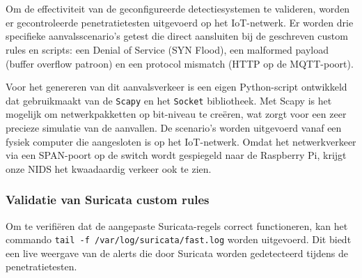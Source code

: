 \chapter{}%
\label{ch:Aanvalsscenario's en actieve validatie}
Om de effectiviteit van de geconfigureerde detectiesystemen te valideren, worden er gecontroleerde penetratietesten uitgevoerd op het IoT-netwerk. Er worden drie specifieke aanvalsscenario's getest die direct aansluiten bij de geschreven custom rules en scripts: een Denial of Service (SYN Flood), een malformed payload (buffer overflow patroon) en een protocol mismatch (HTTP op de MQTT-poort).

Voor het genereren van dit aanvalsverkeer is een eigen Python-script ontwikkeld dat gebruikmaakt van de \texttt{Scapy}  en het \texttt{Socket} bibliotheek. Met Scapy is het mogelijk om netwerkpakketten op bit-niveau te creëren, wat zorgt voor een zeer precieze simulatie van de aanvallen. De scenario’s worden uitgevoerd vanaf een fysiek computer die aangesloten is op het IoT-netwerk. Omdat het netwerkverkeer via een SPAN-poort op de switch wordt gespiegeld naar de Raspberry Pi, krijgt onze NIDS het kwaadaardig verkeer ook te zien.

\subsection{Validatie van Suricata custom rules}
Om te verifiëren dat de aangepaste Suricata-regels correct functioneren, kan het commando \texttt{tail -f /var/log/suricata/fast.log} worden uitgevoerd. Dit biedt een live weergave van de alerts die door Suricata worden gedetecteerd tijdens de penetratietesten.



